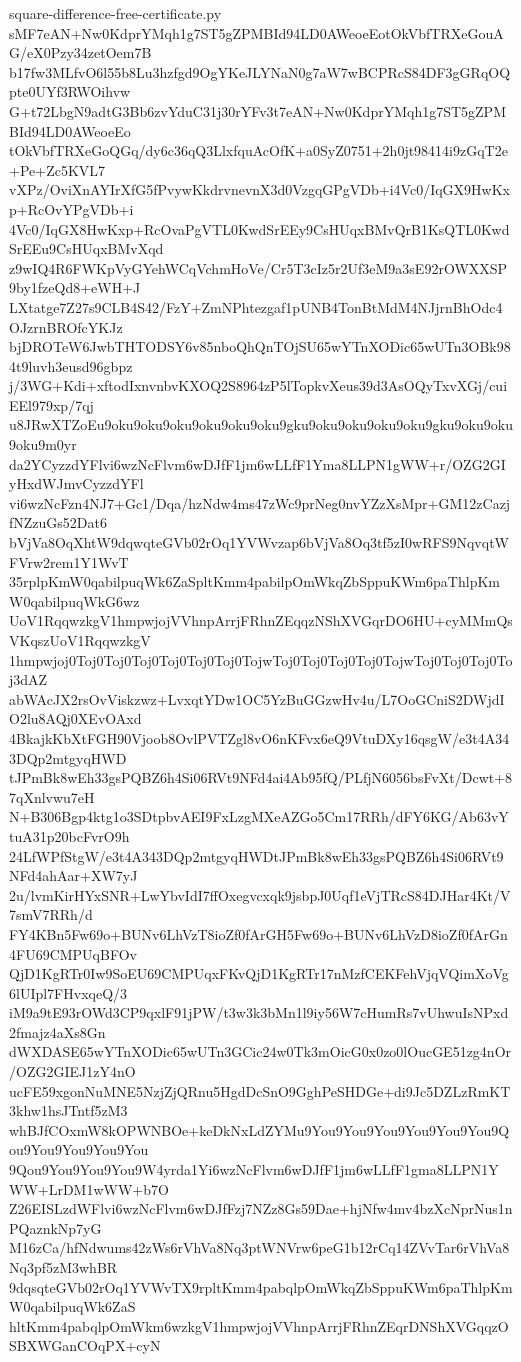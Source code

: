 \documentclass[11pt]{article}
\theoremstyle{definition}
\theoremstyle{remark}
\begin{document}
\begin{filecontents*}[overwrite]{square-difference-free-certificate.py}
sMF7eAN+Nw0KdprYMqh1g7ST5gZPMBId94LD0AWeoeEotOkVbfTRXeGouAG/eX0Pzy34zetOem7B
b17fw3MLfvO6l55b8Lu3hzfgd9OgYKeJLYNaN0g7aW7wBCPRcS84DF3gGRqOQpte0UYf3RWOihvw
G+t72LbgN9adtG3Bb6zvYduC31j30rYFv3t7eAN+Nw0KdprYMqh1g7ST5gZPMBId94LD0AWeoeEo
tOkVbfTRXeGoQGq/dy6c36qQ3LlxfquAcOfK+a0SyZ0751+2h0jt98414i9zGqT2e+Pe+Zc5KVL7
vXPz/OviXnAYIrXfG5fPvywKkdrvnevnX3d0VzgqGPgVDb+i4Vc0/IqGX9HwKxp+RcOvYPgVDb+i
4Vc0/IqGX8HwKxp+RcOvaPgVTL0KwdSrEEy9CsHUqxBMvQrB1KsQTL0KwdSrEEu9CsHUqxBMvXqd
z9wIQ4R6FWKpVyGYehWCqVchmHoVe/Cr5T3cIz5r2Uf3eM9a3sE92rOWXXSP9by1fzeQd8+eWH+J
LXtatge7Z27s9CLB4S42/FzY+ZmNPhtezgaf1pUNB4TonBtMdM4NJjrnBhOdc4OJzrnBROfcYKJz
bjDROTeW6JwbTHTODSY6v85nboQhQnTOjSU65wYTnXODic65wUTn3OBk984t9luvh3eusd96gbpz
j/3WG+Kdi+xftodIxnvnbvKXOQ2S8964zP5lTopkvXeus39d3AsOQyTxvXGj/cuiEEl979xp/7qj
u8JRwXTZoEu9oku9oku9oku9oku9oku9oku9gku9oku9oku9oku9oku9gku9oku9oku9oku9m0yr
da2YCyzzdYFlvi6wzNcFlvm6wDJfF1jm6wLLfF1Yma8LLPN1gWW+r/OZG2GIyHxdWJmvCyzzdYFl
vi6wzNcFzn4NJ7+Gc1/Dqa/hzNdw4ms47zWc9prNeg0nvYZzXsMpr+GM12zCazjfNZzuGs52Dat6
bVjVa8OqXhtW9dqwqteGVb02rOq1YVWvzap6bVjVa8Oq3tf5zI0wRFS9NqvqtWFVrw2rem1Y1WvT
35rplpKmW0qabilpuqWk6ZaSpltKmm4pabilpOmWkqZbSppuKWm6paThlpKmW0qabilpuqWkG6wz
UoV1RqqwzkgV1hmpwjojVVhnpArrjFRhnZEqqzNShXVGqrDO6HU+cyMMmQsVKqszUoV1RqqwzkgV
1hmpwjoj0Toj0Toj0Toj0Toj0Toj0Toj0TojwToj0Toj0Toj0Toj0TojwToj0Toj0Toj0Toj3dAZ
abWAcJX2rsOvViskzwz+LvxqtYDw1OC5YzBuGGzwHv4u/L7OoGCniS2DWjdIO2lu8AQj0XEvOAxd
4BkajkKbXtFGH90Vjoob8OvlPVTZgl8vO6nKFvx6eQ9VtuDXy16qsgW/e3t4A343DQp2mtgyqHWD
tJPmBk8wEh33gsPQBZ6h4Si06RVt9NFd4ai4Ab95fQ/PLfjN6056bsFvXt/Dcwt+87qXnlvwu7eH
N+B306Bgp4ktg1o3SDtpbvAEI9FxLzgMXeAZGo5Cm17RRh/dFY6KG/Ab63vYtuA31p20bcFvrO9h
24LfWPfStgW/e3t4A343DQp2mtgyqHWDtJPmBk8wEh33gsPQBZ6h4Si06RVt9NFd4ahAar+XW7yJ
2u/lvmKirHYxSNR+LwYbvIdI7ffOxegvcxqk9jsbpJ0Uqf1eVjTRcS84DJHar4Kt/V7smV7RRh/d
FY4KBn5Fw69o+BUNv6LhVzT8ioZf0fArGH5Fw69o+BUNv6LhVzD8ioZf0fArGn4FU69CMPUqBFOv
QjD1KgRTr0Iw9SoEU69CMPUqxFKvQjD1KgRTr17nMzfCEKFehVjqVQimXoVg6lUIpl7FHvxqeQ/3
iM9a9tE93rOWd3CP9qxlF91jPW/t3w3k3bMn1l9iy56W7cHumRs7vUhwuIsNPxd2fmajz4aXs8Gn
dWXDASE65wYTnXODic65wUTn3GCic24w0Tk3mOicG0x0zo0lOucGE51zg4nOr/OZG2GIEJ1zY4nO
ucFE59xgonNuMNE5NzjZjQRnu5HgdDcSnO9GghPeSHDGe+di9Jc5DZLzRmKT3khw1hsJTntf5zM3
whBJfCOxmW8kOPWNBOe+keDkNxLdZYMu9You9You9You9You9You9You9Qou9You9You9You9You
9Qou9You9You9You9W4yrda1Yi6wzNcFlvm6wDJfF1jm6wLLfF1gma8LLPN1YWW+LrDM1wWW+b7O
Z26EISLzdWFlvi6wzNcFlvm6wDJfFzj7NZz8Gs59Dae+hjNfw4mv4bzXcNprNus1nPQaznkNp7yG
M16zCa/hfNdwums42zWs6rVhVa8Nq3ptWNVrw6peG1b12rCq14ZVvTar6rVhVa8Nq3pf5zM3whBR
9dqsqteGVb02rOq1YVWvTX9rpltKmm4pabqlpOmWkqZbSppuKWm6paThlpKmW0qabilpuqWk6ZaS
hltKmm4pabqlpOmWkm6wzkgV1hmpwjojVVhnpArrjFRhnZEqrDNShXVGqqzOSBXWGanCOqPX+cyN

\end{filecontents*}
\end{document}
